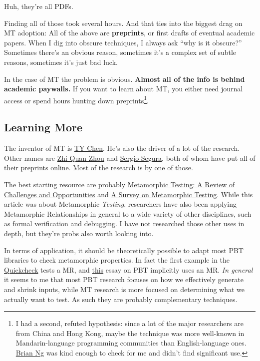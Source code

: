 Huh, they're all PDFs.

Finding all of those took several hours. And that ties into the biggest
drag on MT adoption: All of the above are \textbf{preprints}, or first
drafts of eventual academic papers. When I dig into obscure techniques,
I always ask ``why is it obscure?'' Sometimes there's an obvious reason,
sometimes it's a complex set of subtle reasons, sometimes it's just bad
luck.

In the case of MT the problem is obvious. \textbf{Almost all of the info
is behind academic paywalls.} If you want to learn about MT, you either
need journal access or spend hours hunting down
preprints\footnote{I had a second, refuted hypothesis:
  since a lot of the major researchers are from China and Hong Kong,
  maybe the technique was more well-known in Mandarin-language
  programming communities than English-language ones.
  \href{https://twitter.com/sindarknave}{Brian Ng} was kind enough to
  check for me and didn't find significant use.}.

\hypertarget{learning-more}{%
\subsection{Learning More}\label{learning-more}}

The inventor of MT is
\href{https://www.swinburne.edu.au/science-engineering-technology/staff/profile/index.php?id=tychen}{TY
Chen}. He's also the driver of a lot of the research. Other names are
\href{https://www.uow.edu.au/~zhiquan/}{Zhi Quan Zhou} and
\href{http://personal.us.es/sergiosegura/publications/}{Sergio Segura},
both of whom have put all of their preprints online. Most of the
research is by one of those.

The best starting resource are probably
\href{http://www.cs.hku.hk/research/techreps/document/TR-2017-04.pdf}{Metamorphic
Testing: A Review of Challenges and Opportunities} and
\href{http://www.lsi.us.es/~segura/files/papers/segura16-tse.pdf}{A
Survey on Metamorphic Testing}. While this article was about Metamorphic
\emph{Testing}, researchers have also been applying Metamorphic
Relationships in general to a wide variety of other disciplines, such as
formal verification and debugging. I have not researched those other
uses in depth, but they're probs also worth looking into.

In terms of application, it should be theoretically possible to adapt
most PBT libraries to check metamorphic properties. In fact the first
example in the
\href{https://www.cs.tufts.edu/~nr/cs257/archive/john-hughes/quick.pdf}{Quickcheck}
tests a MR, and
\href{https://hypothesis.works/articles/testing-optimizers-with-hypothesis/}{this}
essay on PBT implicitly uses an MR. \emph{In general} it seems to me
that most PBT research focuses on how we effectively generate and shrink
inputs, while MT research is more focused on determining what we
actually want to test. As such they are probably complementary
techniques.

